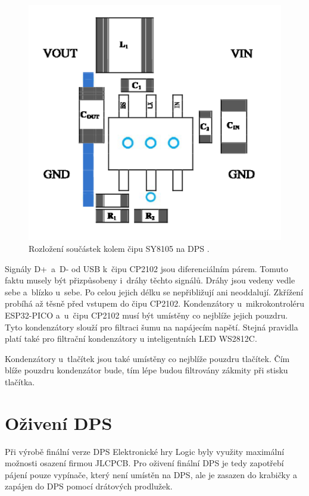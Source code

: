   \begin{figure}[!h]
    \begin{center}
      \includegraphics[scale=1]{obrazky/SY8105_rozlozeni_na_DPS.png}
    \end{center}
    \caption[Rozložení součástek kolem čipu SY8105 na DPS \cite{SY8105_datasheet}]{Rozložení součástek kolem čipu SY8105 na DPS 
    \cite{SY8105_datasheet}.}
  \end{figure}

  Signály D+~a~D- od USB k~čipu CP2102 jsou diferenciálním párem. Tomuto faktu musely být přizpůsobeny i~dráhy těchto signálů. Dráhy 
  jsou vedeny vedle sebe a~blízko u~sebe. Po celou jejich délku se nepřibližují ani neoddalují. Zkřížení probíhá až těsně před vstupem do čipu CP2102.
  Kondenzátory u~mikrokontroléru ESP32-PICO a~u~čipu CP2102 musí být umístěny co nejblíže jejich pouzdru. Tyto kondenzátory slouží pro 
  filtraci šumu na napájecím napětí. Stejná pravidla platí také pro filtrační kondenzátory u inteligentních LED WS2812C.

  Kondenzátory u~tlačítek jsou také umístěny co nejblíže pouzdru tlačítek. Čím blíže pouzdru kondenzátor bude, tím lépe budou 
  filtrovány zákmity při stisku tlačítka.

  \chapter{Oživení DPS}
  Při výrobě finální verze DPS Elektronické hry Logic byly využity maximální možnosti osazení firmou JLCPCB.  
  Pro oživení finální DPS je tedy zapotřebí pájení pouze vypínače, který není umístěn na DPS, ale je zasazen do krabičky a zapájen
  do DPS pomocí drátových prodlužek. 

